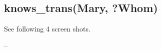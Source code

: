 \documentclass[letterpaper,10pt,english]{sphinxmanual}
\begin{document}
\subsection{knows\_trans(Mary, ?Whom)}
\label{assign3:knows-trans-mary-whom}
See following 4 screen shots.
\begin{figure}[htbp]
\centering

\end{figure}

--
\begin{figure}[htbp]
\centering

\end{figure}
\end{document}
